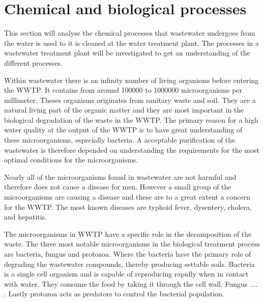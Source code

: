 \section{Chemical and biological processes}\label{se:chemical_process}
This section will analyse the chemical processes that wastewater undergoes from the water is used to it is cleaned at the water treatment plant. The processes in a wastewater treatment plant will be investigated to get an understanding of the different processes. %

Within wastewater there is an infinity number of living organisms before entering the WWTP. It contains from around 100000 to 1000000 microorganisms per millimeter. Theses organisms originates from sanitary waste and soil. They are a natural living part of the organic matter and they are most important in the biological degradation of the waste in the WWTP. The primary reason for a high water quality at the output of the WWTP is to have great understanding of these microorganisms, especially bacteria. A acceptable purification of the wastewater is therefore depended on understanding the requirements for the most optimal conditions for the microorganisms. 

Nearly all of the microorganisms found in wastewater are not harmful and therefore does not cause a disease for men. However a small group of the microorganisms are causing a disease and these are to a great extent a concern for the WWTP. The most known diseases are typhoid fever, dysentery, cholera, and hepatitis.

The microorganisms in WWTP have a specific role in the decomposition of the waste. The three most notable microorganisms in the biological treatment process are bacteria, fungus and protozoa. Where the bacteria have the primary role of degrading the wastewater compounds, thereby producing settable soils. Bacteria is a single cell organism and is capable of reproducing rapidly when in contact with water. They consume the food by taking it through the cell wall. Fungus .... .  Lastly protozoa acts as predators to control the bacterial population. 

